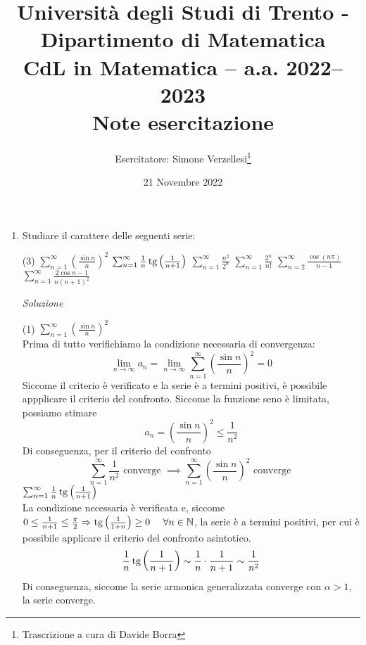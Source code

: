 \documentclass{article}
\title{Università degli Studi di Trento - Dipartimento di Matematica\\
CdL in Matematica – a.a. 2022–2023\\ Note esercitazione}
\author{Esercitatore: Simone Verzellesi\thanks{Trascrizione a cura di Davide Borra}}
\date{21 Novembre 2022}
\begin{document}
\maketitle
{}
\setlength{\headheight}{30pt}
\begin{enumerate}[label=\textbf{Esercizio 9.\arabic*.},itemindent=*]
    \item Studiare il carattere delle seguenti serie:
    \begin{tasks}(3)
        \task $\sum_{n=1}^\infty\left(\frac{\sin n}{n}\right)^2$
        \task $\sum_{n=1}^\infty\frac{1}{n}\operatorname{tg}\left( \frac{1}{n+1} \right)$
        \task $\sum_{n=1}^\infty\frac{n^2}{2^n}$
        \task $\sum_{n=1}^\infty\frac{2^n}{n!}$
        \task $\sum_{n=2}^\infty\frac{\cos(n\pi)}{n-1}$
        \task $\sum_{n=1}^\infty\frac{2\cos n-1}{n(n+1)^2}$
    \end{tasks}
    \item[\textit{\large Soluzione~}]~
    \begin{tasks}(1)
        \task $\sum_{n=1}^\infty\left(\frac{\sin n}{n}\right)^2$\\
        Prima di tutto verifichiamo la condizione necessaria di convergenza: \[\lim_{n\to \infty}a_n=\lim_{n\to \infty}\sum_{n=1}^\infty\left(\frac{\sin n}{n}\right)^2=0\]
        Siccome il criterio è verificato e la serie è a termini positivi, è possibile appplicare il criterio del confronto. Siccome la funzione seno è limitata, possiamo stimare 
        \[a_n=\left(\frac{\sin n}{n}\right)^2\leq\frac{1}{n^2}\]
        Di conseguenza, per il criterio del confronto
        \[\sum_{n=1}^\infty\frac{1}{n^2} \text{ converge }\implies \sum_{n=1}^\infty\left(\frac{\sin n}{n}\right)^2 \text{ converge }\]
        \task $\sum_{n=1}^\infty\frac{1}{n}\operatorname{tg}\left( \frac{1}{n+1} \right)$\\
        La condizione necessaria è verificata e, siccome $0\leq \frac{1}{n+1}\leq \frac{\pi}{2}  \Rightarrow \operatorname{tg}\left( \frac{1}{1+n} \right)\geq 0 ~~~~\forall n\in \mathbb{N}$, la serie è a termini positivi, per cui è possibile applicare il criterio del confronto asintotico.
        \[\frac{1}{n}\operatorname{tg}\left( \frac{1}{n+1} \right)\sim \frac{1}{n}\cdot \frac{1}{n+1}\sim \frac{1}{n^2}\]
        Di conseguenza, siccome la serie armonica generalizzata converge con $\alpha >1$, la serie converge.

\end{tasks}
\end{enumerate}
\end{document}
